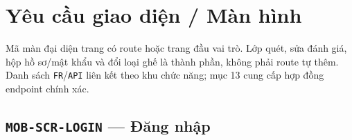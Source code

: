 \clearpage
\section{Yêu cầu giao diện /\allowbreak{} Màn hình}\label{sec:srs-12}
Mã màn đại diện trang có route hoặc trang đầu vai trò. Lớp quét, sửa đánh giá, hộp hồ sơ/\allowbreak{}mật khẩu và đổi loại ghế là thành phần, không phải route tự thêm. Danh sách \texttt{FR}/\allowbreak{}\texttt{API} liên kết theo khu chức năng; mục 13 cung cấp hợp đồng endpoint chính xác.

\subsection{\texttt{MOB-\allowbreak{}SCR-\allowbreak{}LOGIN} — Đăng nhập}
\begingroup
\fontsize{9.5}{12}\selectfont
\setlength{\SRSWidth}{\dimexpr\linewidth-2\tabcolsep\relax}
